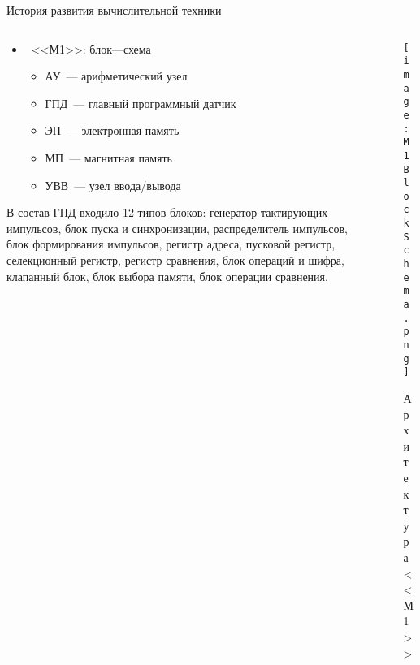 \documentclass[aspectratio=169,14pt]{beamer}
\begin{document}
\begin{frame}{История развития вычислительной техники}
    \begin{columns}[onlytextwidth]
        \begin{column}{0.6\textwidth}
            \begin{itemize}
                \item ~<<М1>>: блок---схема
                \begin{itemize}
                    \item АУ~--- арифметический узел
                    \item ГПД~--- главный программный датчик
                    \item ЭП~--- электронная память
                    \item МП~--- магнитная память
                    \item УВВ~--- узел ввода/вывода
                \end{itemize}
            \end{itemize}
            \begin{scriptsize}
            \begin{spacing}{1.5}
            В состав ГПД входило 12 типов блоков: генератор тактирующих импульсов,
            блок пуска и синхронизации, распределитель импульсов, блок формирования
            импульсов, регистр адреса, пусковой регистр, селекционный регистр,
            регистр сравнения, блок операций и шифра, клапанный блок, блок выбора памяти,
            блок операции сравнения.
            \end{spacing}
            \end{scriptsize}
        \end{column}
        \begin{column}{0.4\textwidth}
            \begin{figure}[htp]
                \centering
                \texttt{[image: M1BlockSchema.png]}
                \caption{\tiny{Архитектура <<М1>>}}
                \label{fig:M1BlockSchema}
            \end{figure}
        \end{column}
    \end{columns}
\end{frame}
\end{document}
